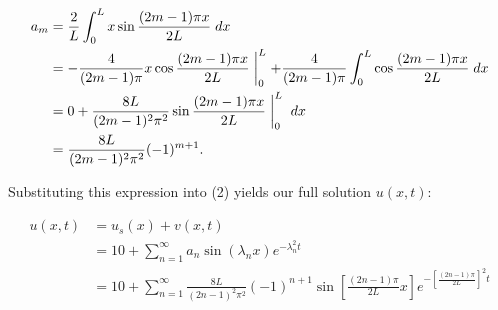 \begin{solution}
    \begin{alignat*}{2}
        a_m &= \frac{2}{L} \int_{0}^{L}{x \sin{\frac{(2m - 1) \pi x}{2L}} \; dx} \\
            &= -\frac{4}{(2m - 1)\pi} x \cos{\frac{(2m - 1) \pi x}{2L}} \biggm\rvert_{0}^{L} 
               + \frac{4}{(2m - 1)\pi} \int_{0}^{L}{\cos{\frac{(2m - 1) \pi x}{2L}} \; dx}  \\
            &= 0 + \frac{8 L}{(2m - 1)^2 \pi^2} \sin{\frac{(2m - 1) \pi x}{2L} \biggm\rvert_{0}^{L} \; dx}  \\
            &= \frac{8L}{(2m - 1)^2 \pi^2} (-1)^{m+1}.
    \end{alignat*}

    \pagebreak
    Substituting this expression into (2) yields our full solution $u(x, t)$:
    
    \begin{align*}
    u(x, t) &= u_s(x) + v(x, t) \\
            &= 10 + \sum\limits_{n=1}^{\infty}{a_n \sin{\left(\lambda_n x\right)} e^{-\lambda_n^2 t}} \\
            &= 10 + \sum\limits_{n=1}^{\infty}{\frac{8 L}{(2n - 1)^2 \pi^2} (-1)^{n+1} \sin{\left[\frac{(2n - 1) \pi}{2L} x \right]} e^{-\left[ \frac{(2 n - 1) \pi}{2L} \right]^2 t}}
    \end{align*}





\end{solution}
